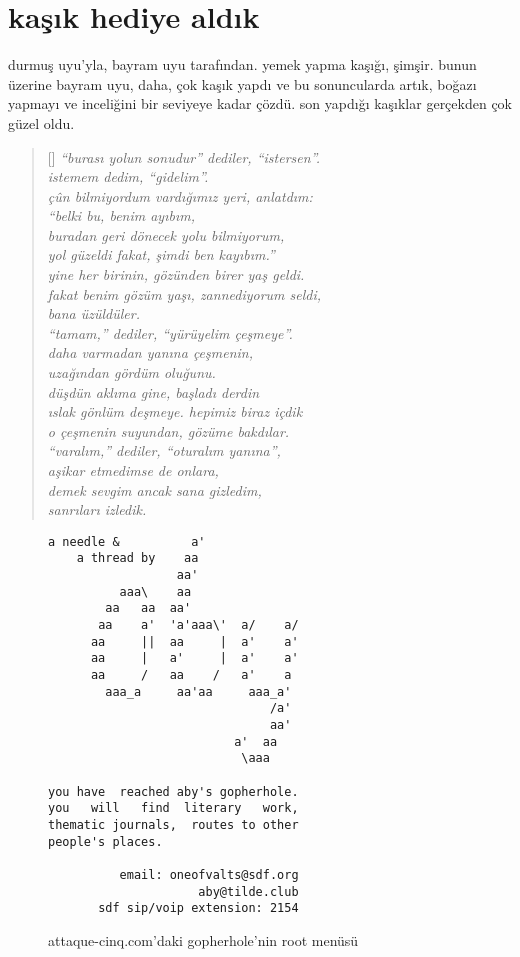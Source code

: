 \documentclass[9pt, a5paper, twocolumn, openright]{memoir}
\begin{document}
\section{kaşık hediye aldık}
durmuş uyu'yla, bayram uyu tarafından. yemek yapma kaşığı, şimşir.
bunun üzerine bayram uyu, daha, çok kaşık yapdı ve bu sonuncularda artık,
boğazı yapmayı ve inceliğini bir seviyeye kadar çözdü. son yapdığı
kaşıklar gerçekden çok güzel oldu.
\begin{verse}[\versewidth]
  \itshape{}
  ``burası yolun sonudur'' dediler, ``istersen''.\\
  istemem dedim, ``gidelim''.\\
  çûn bilmiyordum vardığımız yeri, anlatdım:\\
  ``belki bu, benim ayıbım,\\
  buradan geri dönecek yolu bilmiyorum,\\
  yol güzeldi fakat, şimdi ben kayıbım.''\\
  yine her birinin, gözünden birer yaş geldi.\\
  fakat benim gözüm yaşı, zannediyorum seldi,\\
  bana üzüldüler.\\
  ``tamam,'' dediler, ``yürüyelim çeşmeye''.\\
  daha varmadan yanına çeşmenin,\\
  uzağından gördüm oluğunu.\\
  düşdün aklıma gine, başladı derdin\\
  ıslak gönlüm deşmeye. hepimiz biraz içdik\\
  o çeşmenin suyundan, gözüme bakdılar.\\
  ``varalım,'' dediler, ``oturalım yanına'',\\
  aşikar etmedimse de onlara,\\
  demek sevgim ancak sana gizledim,\\
  sanrıları izledik.\\
\end{verse}
\begin{figure}[H]
\begin{verbatim}
a needle &          a'
    a thread by    aa
                  aa'
          aaa\    aa
        aa   aa  aa'
       aa    a'  'a'aaa\'  a/    a/
      aa     ||  aa     |  a'    a'
      aa     |   a'     |  a'    a'
      aa     /   aa    /   a'    a
        aaa_a     aa'aa     aaa_a'
                               /a'
                               aa'
                          a'  aa
                           \aaa

you have  reached aby's gopherhole.
you   will   find  literary   work,
thematic journals,  routes to other
people's places.

          email: oneofvalts@sdf.org
                     aby@tilde.club
       sdf sip/voip extension: 2154
\end{verbatim}
  \caption{attaque-cinq.com'daki gopherhole'nin root menüsü}
\end{figure}
\end{document}
